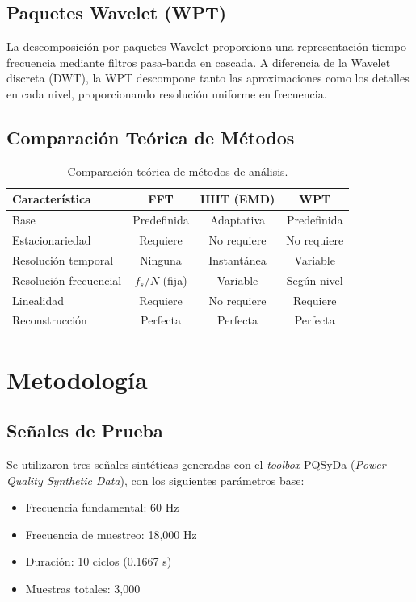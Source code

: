\documentclass[12pt,a4paper]{article}
\begin{document}
\subsection{Paquetes Wavelet (WPT)}

La descomposición por paquetes Wavelet proporciona una representación tiempo-frecuencia mediante filtros pasa-banda en cascada. A diferencia de la Wavelet discreta (DWT), la WPT descompone tanto las aproximaciones como los detalles en cada nivel, proporcionando resolución uniforme en frecuencia.

\subsection{Comparación Teórica de Métodos}

\begin{table}[H]
\centering
\caption{Comparación teórica de métodos de análisis.}
\begin{tabular}{@{}lccc@{}}
\toprule
\textbf{Característica} & \textbf{FFT} & \textbf{HHT (EMD)} & \textbf{WPT} \\
\midrule
Base & Predefinida & Adaptativa & Predefinida \\
Estacionariedad & Requiere & No requiere & No requiere \\
Resolución temporal & Ninguna & Instantánea & Variable \\
Resolución frecuencial & $f_s/N$ (fija) & Variable & Según nivel \\
Linealidad & Requiere & No requiere & Requiere \\
Reconstrucción & Perfecta & Perfecta & Perfecta \\
\bottomrule
\end{tabular}
\label{tab:comparacion_teorica}
\end{table}


\section{Metodología}

\subsection{Señales de Prueba}

Se utilizaron tres señales sintéticas generadas con el \textit{toolbox} PQSyDa (\textit{Power Quality Synthetic Data}), con los siguientes parámetros base:
\begin{itemize}
    \item Frecuencia fundamental: 60 Hz
    \item Frecuencia de muestreo: 18{,}000 Hz
    \item Duración: 10 ciclos (0.1667 s)
    \item Muestras totales: 3{,}000
\end{itemize}
\end{document}
